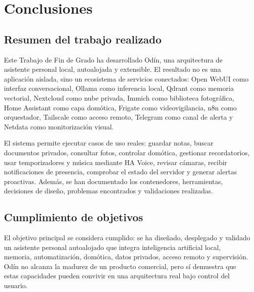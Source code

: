 \chapter{Conclusiones}

\section{Resumen del trabajo realizado}
Este Trabajo de Fin de Grado ha desarrollado Odín, una arquitectura de asistente personal local, autoalojada y extensible. El resultado no es una aplicación aislada, sino un ecosistema de servicios conectados: Open WebUI como interfaz conversacional, Ollama como inferencia local, Qdrant como memoria vectorial, Nextcloud como nube privada, Immich como biblioteca fotográfica, Home Assistant como capa domótica, Frigate como videovigilancia, n8n como orquestador, Tailscale como acceso remoto, Telegram como canal de alerta y Netdata como monitorización visual.

El sistema permite ejecutar casos de uso reales: guardar notas, buscar documentos privados, consultar fotos, controlar domótica, gestionar recordatorios, usar temporizadores y música mediante HA Voice, revisar cámaras, recibir notificaciones de presencia, comprobar el estado del servidor y generar alertas proactivas. Además, se han documentado los contenedores, herramientas, decisiones de diseño, problemas encontrados y validaciones realizadas.

\section{Cumplimiento de objetivos}
El objetivo principal se considera cumplido: se ha diseñado, desplegado y validado un asistente personal autoalojado que integra inteligencia artificial local, memoria, automatización, domótica, datos privados, acceso remoto y supervisión. Odín no alcanza la madurez de un producto comercial, pero sí demuestra que estas capacidades pueden convivir en una arquitectura real bajo control del usuario.

